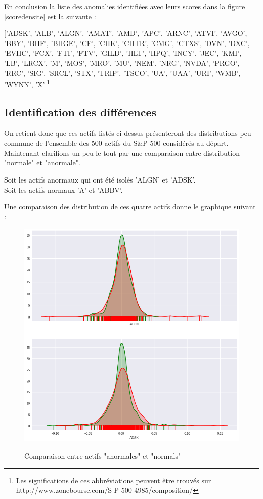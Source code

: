 En conclusion la liste des anomalies identifiées avec leurs scores dans la figure \ref{scoredensite} est la suivante : 

['ADSK', 'ALB', 'ALGN', 'AMAT', 'AMD', 'APC', 'ARNC', 'ATVI', 'AVGO',
       'BBY', 'BHF', 'BHGE', 'CF', 'CHK', 'CHTR', 'CMG', 'CTXS', 'DVN', 'DXC',
       'EVHC', 'FCX', 'FTI', 'FTV', 'GILD', 'HLT', 'HPQ', 'INCY', 'JEC', 'KMI',
       'LB', 'LRCX', 'M', 'MOS', 'MRO', 'MU', 'NEM', 'NRG', 'NVDA', 'PRGO',
       'RRC', 'SIG', 'SRCL', 'STX', 'TRIP', 'TSCO', 'UA', 'UAA', 'URI', 'WMB',
       'WYNN', 'X']\footnote{ Les significations de ces abbréviations peuvent être trouvés sur http://www.zonebourse.com/S-P-500-4985/composition/}

\subsection{Identification des différences}

On retient donc que ces actifs listés ci dessus présenteront des distributions peu commune de l'ensemble des 500 actifs du S\&P 500 considérés au départ.
Maintenant clarifions un peu le tout par une comparaison entre distribution "normale" et "anormale".

Soit les actifs anormaux qui ont été isolés 'ALGN' et 'ADSK'. 
\\
Soit les actifs normaux 'A' et 'ABBV'.

Une comparaison des distribution de ces quatre actifs donne le graphique suivant : 

\begin{figure}[H]
\centering
\caption{Comparaison entre actifs "anormales" et "normals"}
   \includegraphics[scale=0.7]{img/anomalie_vs_normal.png}
 \label{anorm}
\end{figure}

